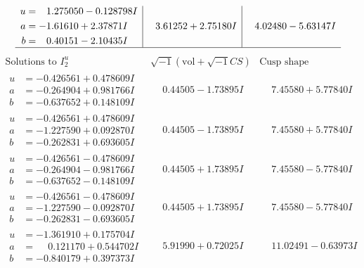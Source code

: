 \documentclass[1p]{elsarticle_modified}
\theoremstyle{definition}
\newcommand{\I}{\sqrt{-1}}
\begin{document}
$$\begin{array}{c|c|c}
\begin{aligned}
u &= \phantom{-}1.275050 - 0.128798 I \\
a &= -1.61610 + 2.37871 I \\
b &= \phantom{-}0.40151 - 2.10435 I\end{aligned}
 & \phantom{-}3.61252 + 2.75180 I & \phantom{-}4.02480 - 5.63147 I\\
 \hline 
 \end{array}$$\newpage$$\begin{array}{c|c|c}  
\text{Solutions to }I^u_{2}& \I (\text{vol} + \sqrt{-1}CS) & \text{Cusp shape}\\
 \hline 
\begin{aligned}
u &= -0.426561 + 0.478609 I \\
a &= -0.264904 + 0.981766 I \\
b &= -0.637652 + 0.148109 I\end{aligned}
 & \phantom{-}0.44505 - 1.73895 I & \phantom{-}7.45580 + 5.77840 I \\ \hline\begin{aligned}
u &= -0.426561 + 0.478609 I \\
a &= -1.227590 + 0.092870 I \\
b &= -0.262831 + 0.693605 I\end{aligned}
 & \phantom{-}0.44505 - 1.73895 I & \phantom{-}7.45580 + 5.77840 I \\ \hline\begin{aligned}
u &= -0.426561 - 0.478609 I \\
a &= -0.264904 - 0.981766 I \\
b &= -0.637652 - 0.148109 I\end{aligned}
 & \phantom{-}0.44505 + 1.73895 I & \phantom{-}7.45580 - 5.77840 I \\ \hline\begin{aligned}
u &= -0.426561 - 0.478609 I \\
a &= -1.227590 - 0.092870 I \\
b &= -0.262831 - 0.693605 I\end{aligned}
 & \phantom{-}0.44505 + 1.73895 I & \phantom{-}7.45580 - 5.77840 I \\ \hline\begin{aligned}
u &= -1.361910 + 0.175704 I \\
a &= \phantom{-}0.121170 + 0.544702 I \\
b &= -0.840179 + 0.397373 I\end{aligned}
 & \phantom{-}5.91990 + 0.72025 I & \phantom{-}11.02491 - 0.63973 I \\ \hline\begin{aligned}

\end{aligned}
\end{array}$$
\end{document}

